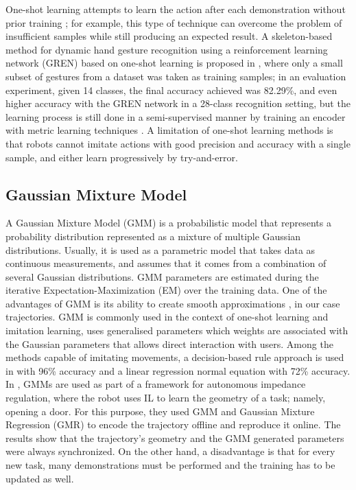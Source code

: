 \documentclass[thesis]{mas_proposal}
\begin{document}
    One-shot learning attempts to learn the action after each demonstration without prior training \cite{Yan2010}; for example, this type of technique can overcome the problem of insufficient samples while still producing an expected result. A skeleton-based method for dynamic hand gesture recognition using a reinforcement learning network (GREN) based on one-shot learning is proposed in \cite{Chunyong2020}, where only a small subset of gestures from a dataset was taken as training samples; in an evaluation experiment, given 14 classes, the final accuracy achieved was 82.29\%, and even higher accuracy with the GREN network in a 28-class recognition setting, but the learning process is still done in a semi-supervised manner by training an encoder with metric learning techniques \cite{Sabater2021}. A limitation of one-shot learning methods is that robots cannot imitate actions with good precision and accuracy with a single sample, and either learn progressively by try-and-error.
    
    \subsection{Gaussian Mixture Model}
    
    A Gaussian Mixture Model (GMM) is a probabilistic model that represents a probability distribution represented as a mixture of multiple Gaussian distributions. Usually, it is used as a parametric model that takes data as continuous measurements, and assumes that it comes from a combination of several Gaussian distributions. GMM parameters are estimated during the iterative Expectation-Maximization (EM) over the training data. One of the advantages of GMM is its ability to create smooth approximations \cite{Reynolds2009}, in our case trajectories. GMM is commonly used in the context of one-shot learning and imitation learning, uses generalised parameters which weights are associated with the Gaussian parameters that allows direct interaction with users. Among the methods capable of imitating movements, a decision-based rule approach is used in \cite{Itauma2012} with 96\% accuracy and a linear regression normal equation with 72\% accuracy. In \cite{Wu2020}, GMMs are used as part of a framework for autonomous impedance regulation, where the robot uses IL to learn the geometry of a task; namely, opening a door. For this purpose, they used GMM and Gaussian Mixture Regression (GMR) to encode the trajectory offline and reproduce it online. The results show that the trajectory's geometry and the GMM generated parameters were always synchronized. On the other hand, a disadvantage is that for every new task, many demonstrations must be performed and the training has to be updated as well.
    
\end{document}
